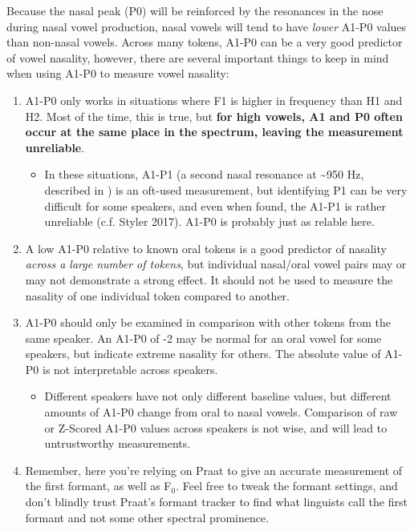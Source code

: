 \documentclass[11pt]{article}
\def\tightlist{}
\begin{document}
Because the nasal peak (P0) will be reinforced by the resonances in the
nose during nasal vowel production, nasal vowels will tend to have
\emph{lower} A1-P0 values than non-nasal vowels. Across many tokens,
A1-P0 can be a very good predictor of vowel nasality, however, there are
several important things to keep in mind when using A1-P0 to measure
vowel nasality:

\begin{enumerate}
\def\labelenumi{\arabic{enumi}.}
\tightlist
\item
  A1-P0 only works in situations where F1 is higher in frequency than H1
  and H2. Most of the time, this is true, but \textbf{for high vowels,
  A1 and P0 often occur at the same place in the spectrum, leaving the
  measurement unreliable}.

  \begin{itemize}
  \tightlist
  \item
    In these situations, A1-P1 (a second nasal resonance at
    \textasciitilde950 Hz, described in \cite{Chen:1997vr}) is an
    oft-used measurement, but identifying P1 can be very difficult for
    some speakers, and even when found, the A1-P1 is rather unreliable
    (c.f. Styler 2017). A1-P0 is probably just as relable here.
  \end{itemize}
\item
  A low A1-P0 relative to known oral tokens is a good predictor of
  nasality \emph{across a large number of tokens}, but individual
  nasal/oral vowel pairs may or may not demonstrate a strong effect. It
  should not be used to measure the nasality of one individual token
  compared to another.
\item
  A1-P0 should only be examined in comparison with other tokens from the
  same speaker. An A1-P0 of -2 may be normal for an oral vowel for some
  speakers, but indicate extreme nasality for others. The absolute value
  of A1-P0 is not interpretable across speakers.

  \begin{itemize}
  \tightlist
  \item
    Different speakers have not only different baseline values, but
    different amounts of A1-P0 change from oral to nasal vowels.
    Comparison of raw or Z-Scored A1-P0 values across speakers is not
    wise, and will lead to untrustworthy measurements.
  \end{itemize}
\item
  Remember, here you're relying on Praat to give an accurate measurement
  of the first formant, as well as F$_{0}$. Feel free to tweak the formant
  settings, and don't blindly trust Praat's formant tracker to find what
  linguists call the first formant and not some other spectral
  prominence.
\end{enumerate}
\end{document}
